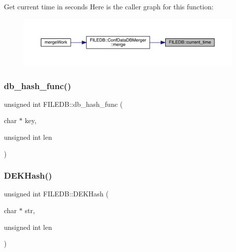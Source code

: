 Get current time in seconds Here is the caller graph for this function\+:\nopagebreak
\begin{figure}[H]
\begin{center}
\leavevmode
\includegraphics[width=350pt]{d2/de6/namespaceFILEDB_a52d0505cdd535797c05bffb0598ef2a5_icgraph}
\end{center}
\end{figure}
\mbox{\label{namespaceFILEDB_a506040cd2b9f1527e415461aac226fb5}} 
\subsubsection{\texorpdfstring{db\_hash\_func()}{db\_hash\_func()}}
{\footnotesize\ttfamily unsigned int F\+I\+L\+E\+D\+B\+::db\+\_\+hash\+\_\+func (\begin{DoxyParamCaption}\item[{char $\ast$}]{key,  }\item[{unsigned int}]{len }\end{DoxyParamCaption})}

\mbox{\label{namespaceFILEDB_ab2561866ca3a62230f86ec7860fec260}} 
\subsubsection{\texorpdfstring{DEKHash()}{DEKHash()}}
{\footnotesize\ttfamily unsigned int F\+I\+L\+E\+D\+B\+::\+D\+E\+K\+Hash (\begin{DoxyParamCaption}\item[{char $\ast$}]{str,  }\item[{unsigned int}]{len }\end{DoxyParamCaption})}

\mbox{\label{namespaceFILEDB_a7d5f1ce86b07fb3c5ec314fab9bd5e30}} 
